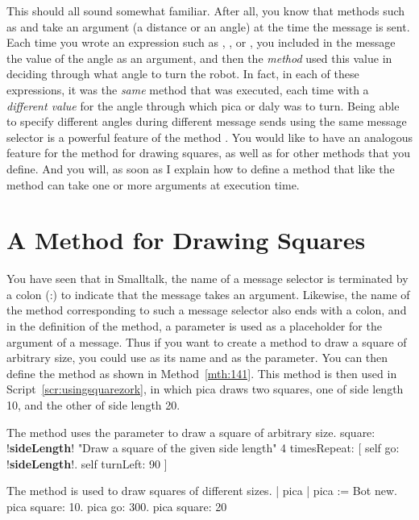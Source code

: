 \documentclass[a4paper,10pt,twoside]{book}
\begin{document}
This should all sound somewhat familiar. After all, you know that methods such as 
and  take an argument (a distance or an angle) at the time the message is sent. 
Each time you wrote an expression such as , , or 
, you included in the message the value of the angle as an argument, and then 
the \emph{method}  used this value in deciding through what angle to turn the robot. In fact, 
in each of these expressions, it was the \emph{same} method  that was executed, each time 
with a \emph{different value} for the angle through which pica or daly was to turn. Being able to specify 
different angles during different message sends using the same message selector  is a 
powerful feature of the method . You would like to have an analogous feature for the 
method for drawing squares, as well as for other methods that you define. And you will, as soon 
as I explain how to define a method that like the method  can take one or more 
arguments at execution time. 

\section{A Method for Drawing Squares}

You have seen that in Smalltalk, the name of a message selector is terminated by a colon (:) 
to indicate that the message takes an argument. Likewise, the name of the method corresponding to such a message selector also ends with a colon, and in the definition of the method, a  parameter is used as a placeholder for the argument of a message. Thus if you want to create  a method to draw a square of arbitrary size, you could use  as its name and  as the parameter. You can then define the method  as shown in Method~\ref{mth:141}. This  method is then used in Script~\ref{scr:usingsquarezork}, in which pica draws two squares, one of side length 10, and the other of side length 20. 

\begin{method}[141]{The method  uses the parameter  to draw a square of arbitrary size.}
square: !\textbf{sideLength}!
   "Draw a square of the given side length" 
   4 timesRepeat: 
      [ self go: !\textbf{sideLength}!. 
      self turnLeft: 90 ] 
\end{method}


\begin{script}[usingsquarezork]{The method  is used to draw squares of different sizes. }
| pica | 
pica := Bot new. 
pica square: 10. 
pica go: 300. 
pica square: 20 
\end{script}
\end{document}
